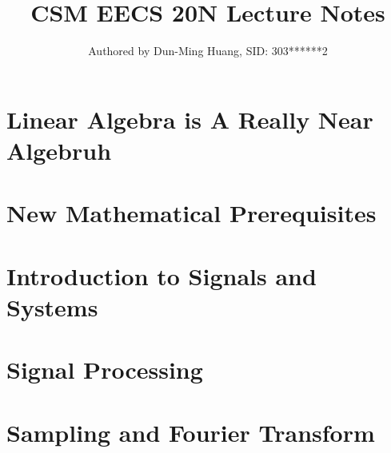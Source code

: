\documentclass[openany]{book}
\title{CSM EECS 20N Lecture Notes}
\author{Authored by Dun-Ming Huang, SID: 303******2}
\begin{document}
\maketitle
\setcounter{tocdepth}{1}

\tableofcontents
\part{Linear Algebra is A Really Near Algebruh}

\newpage

\newpage

\newpage

\newpage

\newpage

\newpage

\newpage

\newpage


\part{New Mathematical Prerequisites}

\newpage

\newpage

\newpage


\part{Introduction to Signals and Systems}

\newpage

\newpage

\newpage

\newpage

\newpage


\part{Signal Processing}

\newpage

\newpage

\newpage

\newpage

\newpage

\newpage

\newpage


\part{Sampling and Fourier Transform}

\newpage

\newpage

\newpage

\newpage

\end{document}
